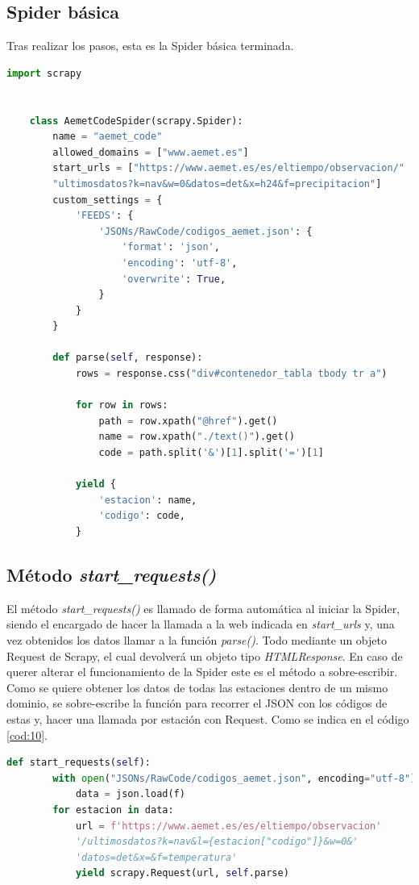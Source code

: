 \subsection{Spider básica}
Tras realizar los pasos, esta es la Spider básica terminada.

\begin{lstlisting}[language=Python, caption={Spider de ejemplo (Aemet Code Spider)}]
	import scrapy
	
	
	class AemetCodeSpider(scrapy.Spider):
		name = "aemet_code"
		allowed_domains = ["www.aemet.es"]
		start_urls = ["https://www.aemet.es/es/eltiempo/observacion/"
		"ultimosdatos?k=nav&w=0&datos=det&x=h24&f=precipitacion"]
		custom_settings = {
			'FEEDS': {
				'JSONs/RawCode/codigos_aemet.json': {
					'format': 'json',
					'encoding': 'utf-8',
					'overwrite': True,
				}
			}
		}
	
		def parse(self, response):
			rows = response.css("div#contenedor_tabla tbody tr a")
			
			for row in rows:
				path = row.xpath("@href").get()
				name = row.xpath("./text()").get()
				code = path.split('&')[1].split('=')[1]
			
			yield {
				'estacion': name,
				'codigo': code,
			}
\end{lstlisting}

\subsection{Método \textit{start\_requests()}}
\label{Chap514}
El método \textit{start\_requests()} es llamado de forma automática al iniciar la Spider, siendo el encargado de hacer la llamada a la web indicada en \textit{start\_urls} y, una vez obtenidos los datos llamar a la función \textit{parse()}. Todo mediante un objeto Request de Scrapy, el cual devolverá un objeto tipo \textit{HTMLResponse}. En caso de querer alterar el funcionamiento de la Spider este es el método a sobre-escribir.\newline
\newline
Como se quiere obtener los datos de todas las estaciones dentro de un mismo dominio, se sobre-escribe la función para recorrer el JSON con los códigos de estas y, hacer una llamada por estación con Request. Como se indica en el código \ref{cod:10}.

\begin{lstlisting}[language=Python, caption={Sobre-escritura de \textit{start\_requests()}}, label=cod:10]
	def start_requests(self):
		with open("JSONs/RawCode/codigos_aemet.json", encoding="utf-8") as f:
			data = json.load(f)
		for estacion in data:
			url = f'https://www.aemet.es/es/eltiempo/observacion'
			'/ultimosdatos?k=nav&l={estacion["codigo"]}&w=0&'
			'datos=det&x=&f=temperatura'
			yield scrapy.Request(url, self.parse)
\end{lstlisting}

